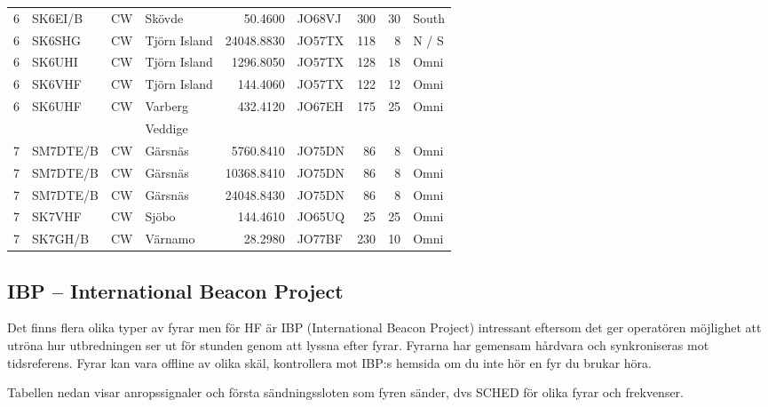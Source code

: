 \begin{landscape}
\begin{longtable}{rlllrlrrl}
	       6 & SK6EI/B    & CW       & Skövde       &      50.4600 & JO68VJ      &      300 &       30 & South        \\
	       6 & SK6SHG     & CW       & Tjörn Island &   24048.8830 & JO57TX      &      118 &        8 & N / S        \\
	       6 & SK6UHI     & CW       & Tjörn Island &    1296.8050 & JO57TX      &      128 &       18 & Omni         \\
	       6 & SK6VHF     & CW       & Tjörn Island &     144.4060 & JO57TX      &      122 &       12 & Omni         \\
	       6 & SK6UHF     & CW       & Varberg      &     432.4120 & JO67EH      &      175 &       25 & Omni         \\
	         &            &          & Veddige      &              &             &          &          &              \\
	       7 & SM7DTE/B   & CW       & Gärsnäs      &    5760.8410 & JO75DN      &       86 &        8 & Omni         \\
	       7 & SM7DTE/B   & CW       & Gärsnäs      &   10368.8410 & JO75DN      &       86 &        8 & Omni         \\
	       7 & SM7DTE/B   & CW       & Gärsnäs      &   24048.8430 & JO75DN      &       86 &        8 & Omni         \\
	       7 & SK7VHF     & CW       & Sjöbo        &     144.4610 & JO65UQ      &       25 &       25 & Omni         \\
	       7 & SK7GH/B    & CW       & Värnamo      &      28.2980 & JO77BF      &      230 &       10 & Omni
\end{longtable}
\end{landscape}

\clearpage

\subsection{IBP -- International Beacon Project}

Det finns flera olika typer av fyrar men för HF är IBP (International Beacon
Project) intressant eftersom det ger operatören möjlighet att utröna hur
utbredningen ser ut för stunden genom att lyssna efter fyrar. Fyrarna har
gemensam hårdvara och synkroniseras mot tidsreferens. Fyrar kan vara offline
av olika skäl, kontrollera mot IBP:s hemsida om du inte hör en fyr du brukar
höra.

Tabellen nedan visar anropssignaler och första sändningssloten som fyren
sänder, dvs SCHED för olika fyrar och frekvenser.

